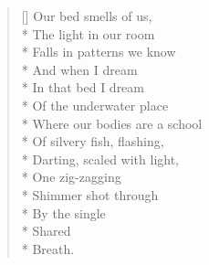 \label{ch:sonnet}
\settowidth{\versewidth}{Where our bodies are a school}
\begin{verse}[\versewidth]
Our bed smells of us,\\*
The light in our room\\*
Falls in patterns we know\\*
And when I dream\\*
In that bed I dream\\*
Of the underwater place\\*
Where our bodies are a school\\*
Of silvery fish, flashing,\\*
Darting, scaled with light,\\*
One zig-zagging\\*
Shimmer shot through\\*
By the single\\*
Shared\\*
Breath.
\end{verse}
